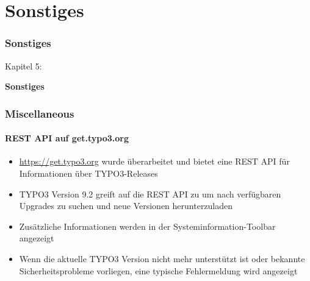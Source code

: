 %

\section{Sonstiges}
\begin{frame}[fragile]
	\frametitle{Sonstiges}

	\begin{center}\huge{Kapitel 5:}\end{center}
	\begin{center}\huge{\color{typo3darkgrey}\textbf{Sonstiges}}\end{center}

\end{frame}


\begin{frame}[fragile]
	\frametitle{Miscellaneous}
	\framesubtitle{REST API auf get.typo3.org}

	\begin{itemize}
		\item \url{https://get.typo3.org} wurde überarbeitet und bietet
			eine REST API für Informationen über TYPO3-Releases
		\item TYPO3 Version 9.2 greift auf die REST API zu um nach verfügbaren
			Upgrades zu suchen und neue Versionen herunterzuladen
		\item Zusätzliche Informationen werden in der Systeminformation-Toolbar angezeigt
		\item Wenn die aktuelle TYPO3 Version nicht mehr unterstützt ist oder bekannte
			Sicherheitsprobleme vorliegen, eine typische Fehlermeldung wird angezeigt
	\end{itemize}

\end{frame}

